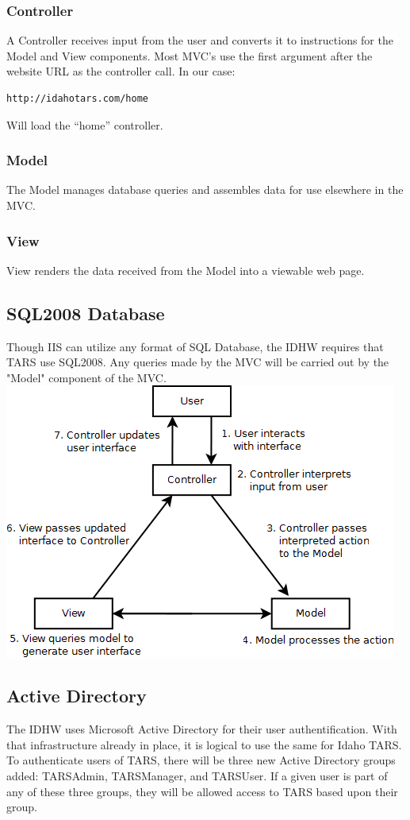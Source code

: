 \documentclass[letterpaper]{article}
\begin{document}
\subsubsection{Controller}
A Controller receives input from the user and converts it to instructions for the Model and View components. Most MVC's use the first argument after the website URL as the controller call. In our case:\\
\begin{verbatim}
http://idahotars.com/home
\end{verbatim}
Will load the ``home'' controller.
\subsubsection{Model}
The Model manages database queries and assembles data for use elsewhere in the MVC.
\subsubsection{View}
View renders the data received from the Model into a viewable web page.
\subsection{SQL2008 Database}
Though IIS can utilize any format of SQL Database, the IDHW requires that TARS use SQL2008. Any queries made by the MVC will be carried out by the "Model" component of the MVC. \\
\includegraphics[scale=0.8]{../design/images/mvc.png}
\subsection{Active Directory}
The IDHW uses Microsoft Active Directory for their user authentification. With that infrastructure already in place, it is logical to use the same for Idaho TARS. To authenticate users of TARS, there will be three new Active Directory groups added: TARSAdmin, TARSManager, and TARSUser. If a given user is part of any of these three groups, they will be allowed access to TARS based upon their group.
\end{document}

